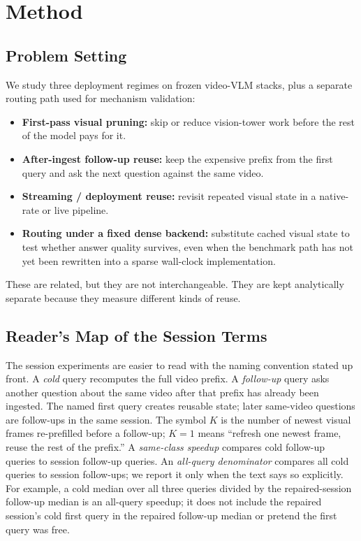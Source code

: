 \section{Method}
\label{sec:method}

\subsection{Problem Setting}

We study three deployment regimes on frozen video-VLM stacks, plus a separate
routing path used for mechanism validation:

\begin{itemize}[leftmargin=1.5em]
\item \textbf{First-pass visual pruning:} skip or reduce vision-tower work
before the rest of the model pays for it.
\item \textbf{After-ingest follow-up reuse:} keep the expensive prefix from the
first query and ask the next question against the same video.
\item \textbf{Streaming / deployment reuse:} revisit repeated visual state in
a native-rate or live pipeline.
\item \textbf{Routing under a fixed dense backend:} substitute cached visual
state to test whether answer quality survives, even when the benchmark path has
not yet been rewritten into a sparse wall-clock implementation.
\end{itemize}

These are related, but they are not interchangeable. They are kept
analytically separate because they measure different kinds of reuse.

\subsection{Reader's Map of the Session Terms}

The session experiments are easier to read with the naming convention stated
up front. A \emph{cold} query recomputes the full video prefix. A
\emph{follow-up} query asks another question about the same video after that
prefix has already been ingested. The named first query creates reusable
state; later same-video questions are follow-ups in the same session. The
symbol \(K\) is the number of newest visual frames re-prefilled before a
follow-up; \(K=1\) means ``refresh one newest frame, reuse the rest of the
prefix.'' A \emph{same-class speedup}
compares cold follow-up queries to session follow-up queries. An
\emph{all-query denominator} compares all cold queries to session follow-ups;
we report it only when the text says so explicitly. For example, a cold median
over all three queries divided by the repaired-session follow-up median is an
all-query speedup; it does not include the repaired session's cold first query
in the repaired follow-up median or pretend the first query was free.

